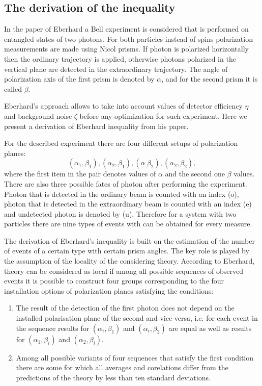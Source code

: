 \documentclass[11pt]{article}
\begin{document}
\subsection{The derivation of the inequality}
In the paper of Eberhard \cite{Eberhard} a Bell experiment is considered that is performed on entangled states of two photons. For both particles instead of spins polarization measurements are made using Nicol prisms. If photon is polarized horizontally then the ordinary trajectory is applied, otherwise photons polarized in the vertical plane are detected in the extraordinary trajectory. The angle of polarization axis of the first prism is denoted by $\alpha$, and for the second prism it is called $\beta$.

Eberhard's approach allows to take into account values of detector efficiency $\eta$ and background noise $\zeta$ before any optimization for such experiment. Here we present a derivation of Eberhard inequality from his paper. 


For the described experiment there are four different setups of polarization planes: \[
(\alpha_1, \beta_1), (\alpha_2, \beta_1), (\alpha_, \beta_2), (\alpha_2, \beta_2),
\] 
where the first item in the pair denotes values of $\alpha$ and the second one $\beta$ values. There are also three possible fates of photon after performing the experiment. Photon that is detected in the ordinary beam is counted with an index (o), photon that is detected in the extraordinary beam is counted with an index (e) and undetected photon is denoted by (u). Therefore for a system with two particles there are nine types of events with can be obtained for every measure.

The derivation of Eberhard's inequality is built on the estimation of the number of events of a certain type with certain prism angles. The key role is played by the assumption of the locality of the considering theory. According to Eberhard, theory can be considered as local if among all possible sequences of observed events it is possible to construct four groups corresponding to the four installation options of polarization planes satisfying the conditions:
\begin{enumerate}[label=(\roman*)]
\item The result of the detection of the first photon does not depend on the installed
polarisation plane of the second and vice versa, i.e. for each event in the sequence results for $(\alpha_i, \beta_1)$ and $(\alpha_i, \beta_2)$ are equal as well as results for $(\alpha_1, \beta_i)$ and $(\alpha_2, \beta_i)$.
\item  Among all possible variants of four sequences that satisfy the first condition there are some for which all averages and corelations differ from the predictions of the theory by less than ten standard deviations.
\end{enumerate}
\end{document}
